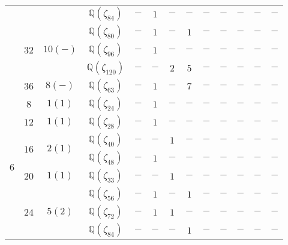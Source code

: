 \documentclass[12pt,a4paper,halfparskip,headsepline,bibtotocnumbered]{scrreprt}
\theoremstyle{nummermitklammern}
\theoremstyle{nonumberbreak}
\newcommand{\Q}{\mathbb{Q}}
\begin{document}
\begin{table}
\begin{tabular}{|c|c|c|c|c|c|c|c|c|c|c|c|c|}
								&						&							&$\Q(\zeta_{84})$	&$-$	&$1$	&$-$	&$-$	&$-$	&$-$	&$-$	&$-$	&$-$\\ \cline{2-13}
								&\multirow{3}{*}{$32$}	&\multirow{3}{*}{$10(-)$}	&$\Q(\zeta_{80})$	&$-$	&$1$	&$-$	&$1$	&$-$	&$-$	&$-$	&$-$	&$-$\\ \cline{4-13}
								&						&							&$\Q(\zeta_{96})$	&$-$	&$1$	&$-$	&$-$	&$-$	&$-$	&$-$	&$-$	&$-$\\ \cline{4-13}
								&						&							&$\Q(\zeta_{120})$	&$-$	&$-$	&$2$	&$5$	&$-$	&$-$	&$-$	&$-$	&$-$\\ \cline{2-13}
								&$36$					&$8(-)$						&$\Q(\zeta_{63})$	&$-$	&$1$	&$-$	&$7$	&$-$	&$-$	&$-$	&$-$	&$-$\\ \hline
		\multirow{8}{*}{$6$}	&$8$					&$1(1)$						&$\Q(\zeta_{24})$	&$-$	&$1$	&$-$	&$-$	&$-$	&$-$	&$-$	&$-$	&$-$\\ \cline{2-13}
								&$12$					&$1(1)$						&$\Q(\zeta_{28})$	&$-$	&$1$	&$-$	&$-$	&$-$	&$-$	&$-$	&$-$	&$-$\\ \cline{2-13}
								&\multirow{2}{*}{$16$}	&\multirow{2}{*}{$2(1)$}	&$\Q(\zeta_{40})$	&$-$	&$-$	&$1$	&$-$	&$-$	&$-$	&$-$	&$-$	&$-$\\ \cline{4-13}
								&						&							&$\Q(\zeta_{48})$	&$-$	&$1$	&$-$	&$-$	&$-$	&$-$	&$-$	&$-$	&$-$\\ \cline{2-13}
								&$20$					&$1(1)$						&$\Q(\zeta_{33})$	&$-$	&$-$	&$1$	&$-$	&$-$	&$-$	&$-$	&$-$	&$-$\\ \cline{2-13}
								&\multirow{3}{*}{$24$}	&\multirow{3}{*}{$5(2)$}	&$\Q(\zeta_{56})$	&$-$	&$1$	&$-$	&$1$	&$-$	&$-$	&$-$	&$-$	&$-$\\ \cline{4-13}
								&						&							&$\Q(\zeta_{72})$	&$-$	&$1$	&$1$	&$-$	&$-$	&$-$	&$-$	&$-$	&$-$\\ \cline{4-13}
								&						&							&$\Q(\zeta_{84})$	&$-$	&$-$	&$-$	&$1$	&$-$	&$-$	&$-$	&$-$	&$-$\\  \hline
	\end{tabular}
\end{table}
\end{document}
